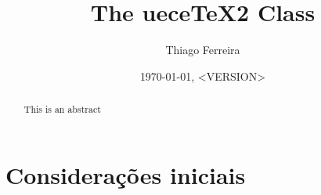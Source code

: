 \documentclass[letterpaper]{ltxdoc}
\title{The uece\TeX2 Class}
\author{Thiago Ferreira}
\date{\today, <VERSION>}
\begin{document}
\maketitle

\begin{abstract}
    This is an abstract
\end{abstract}

\tableofcontents

\section{Considerações iniciais}
\end{document}
